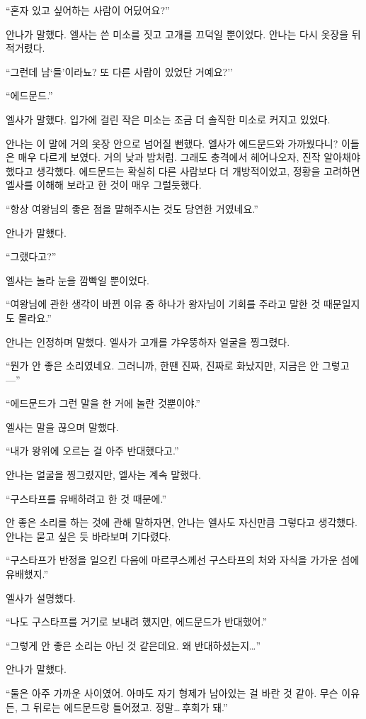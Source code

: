 ``혼자 있고 싶어하는 사람이 어딨어요?''

안나가 말했다. 엘사는 쓴 미소를 짓고 고개를 끄덕일 뿐이었다. 안나는 다시 옷장을 뒤적거렸다.

``그런데 남`들'이라뇨? 또 다른 사람이 있었단 거예요?''

``에드문드.''

엘사가 말했다. 입가에 걸린 작은 미소는 조금 더 솔직한 미소로 커지고 있었다.

안나는 이 말에 거의 옷장 안으로 넘어질 뻔했다. 엘사가 에드문드와 가까웠다니? 이들은 매우 다르게 보였다. 거의 낮과 밤처럼. 그래도 충격에서 헤어나오자, 진작 알아채야 했다고 생각했다. 에드문드는 확실히 다른 사람보다 더 개방적이었고, 정황을 고려하면 엘사를 이해해 보라고 한 것이 매우 그럴듯했다.

``항상 여왕님의 좋은 점을 말해주시는 것도 당연한 거였네요.''

안나가 말했다.

``그랬다고?''

엘사는 놀라 눈을 깜빡일 뿐이었다.

``여왕님에 관한 생각이 바뀐 이유 중 하나가 왕자님이 기회를 주라고 말한 것 때문일지도 몰라요.''

안나는 인정하며 말했다. 엘사가 고개를 갸우뚱하자 얼굴을 찡그렸다.

``뭔가 안 좋은 소리였네요. 그러니까, 한땐 진짜, 진짜로 화났지만, 지금은 안 그렇고—''

``에드문드가 그런 말을 한 거에 놀란 것뿐이야.''

엘사는 말을 끊으며 말했다.

``내가 왕위에 오르는 걸 아주 반대했다고.''

안나는 얼굴을 찡그렸지만, 엘사는 계속 말했다.

``구스타프를 유배하려고 한 것 때문에.''

안 좋은 소리를 하는 것에 관해 말하자면, 안나는 엘사도 자신만큼 그렇다고 생각했다. 안나는 묻고 싶은 듯 바라보며 기다렸다.

``구스타프가 반정을 일으킨 다음에 마르쿠스께선 구스타프의 처와 자식을 가가운 섬에 유배했지.''

엘사가 설명했다.

``나도 구스타프를 거기로 보내려 했지만, 에드문드가 반대했어.''

``그렇게 안 좋은 소리는 아닌 것 같은데요. 왜 반대하셨는지\ldots''

안나가 말했다.

``둘은 아주 가까운 사이였어. 아마도 자기 형제가 남아있는 걸 바란 것 같아. 무슨 이유든, 그 뒤로는 에드문드랑 틀어졌고. 정말\ldots\,후회가 돼.''

